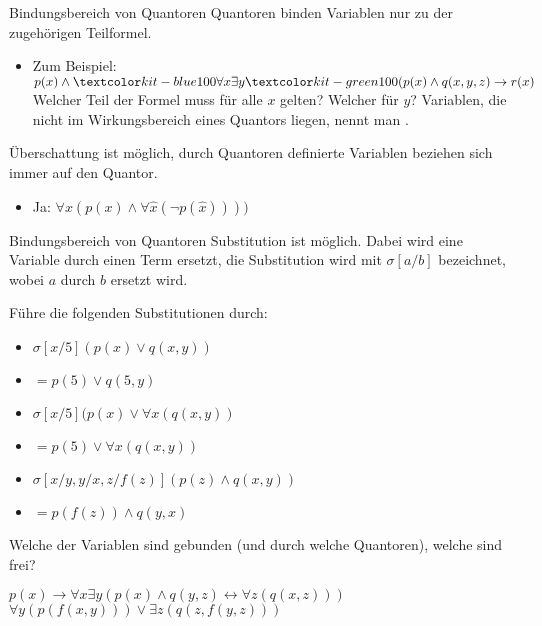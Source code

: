 \documentclass[]{beamer}
\begin{document}
\begin{frame}{Bindungsbereich von Quantoren}
	Quantoren binden Variablen nur zu der zugehörigen Teilformel.
	
	\bp
	
	\begin{itemize}
		\item Zum Beispiel: $p(x) \land \markBlue{\forall x \exists y} \markGreen{(p(x) \land q(x,y,z)} \rightarrow r(x) $
		\pitem Welcher Teil der Formel muss für alle $x$ gelten? Welcher für $y$?
		\pitem Variablen, die nicht im Wirkungsbereich eines Quantors liegen, nennt man .
	\end{itemize}

	\bp Überschattung ist möglich, durch Quantoren definierte Variablen beziehen sich immer auf den  Quantor.
	\begin{itemize}
		\pitem Ist $\forall x (p(x) \land \forall x (\lnot p(x))))$ erfüllbar?
		\pause\item Ja: $\forall x (p(x) \land \forall \hat{x} (\lnot p(\hat{x}))))$ 
	\end{itemize}
\end{frame}

\begin{frame}{Bindungsbereich von Quantoren}
	Substitution ist möglich. Dabei wird eine  Variable durch einen Term ersetzt, die Substitution wird mit $\sigma[a/b]$ bezeichnet, wobei $a$ durch $b$ ersetzt wird.
	
	\vertspace
	
	
	\bp
	
	Führe die folgenden Substitutionen durch:
	\begin{itemize}
		\item<1-> \(\sigma[x/5] (p(x) \lor q(x,y))\)
		\item<4-> \(= p(5) \lor q(5,y)\)
		\item<2-> \(\sigma[x/5] (p(x) \lor \forall x (q(x,y))\)
		\item<5-> \(= p(5) \lor \forall x (q(x,y))\)
		\item<3-> \(\sigma[x/y, y/x, z/f(z)] (p(z) \land q(x,y))\)
		\item<6-> \(= p(f(z)) \land q(y,x)\)
	\end{itemize}

	\vertspace
	
	\bp
	
	Welche der Variablen sind gebunden (und durch welche Quantoren), welche sind frei? 
	\begin{itemize}
		\pitem $p(x) \rightarrow \forall x \exists y (p(x) \land q(y,z) \leftrightarrow \forall z (q(x,z)))$
		\pitem $\forall y(p(f(x,y))) \lor \exists z(q(z,f(y,z)))$
	\end{itemize}
\end{frame}
\end{document}
